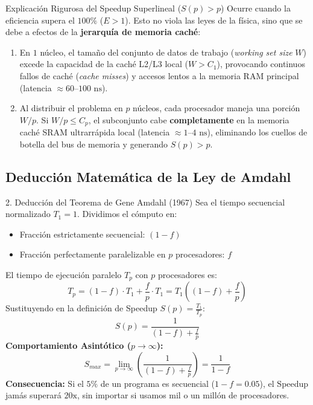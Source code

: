 \documentclass[11pt,a4paper]{article}
\begin{document}
\begin{conceptbox}{Explicación Rigurosa del Speedup Superlineal ($S(p) > p$)}
Ocurre cuando la eficiencia supera el $100\%$ ($E > 1$). Esto no viola las leyes de la física, sino que se debe a efectos de la \textbf{jerarquía de memoria caché}:
\begin{enumerate}[leftmargin=5mm]
    \item En $1$ núcleo, el tamaño del conjunto de datos de trabajo (\textit{working set size} $W$) excede la capacidad de la caché L2/L3 local ($W > C_1$), provocando continuos fallos de caché (\textit{cache misses}) y accesos lentos a la memoria RAM principal (latencia $\approx 60\text{--}100\text{ ns}$).
    \item Al distribuir el problema en $p$ núcleos, cada procesador maneja una porción $W/p$. Si $W/p \le C_p$, el subconjunto cabe \textbf{completamente} en la memoria caché SRAM ultrarrápida local (latencia $\approx 1\text{--}4\text{ ns}$), eliminando los cuellos de botella del bus de memoria y generando $S(p) > p$.
\end{enumerate}
\end{conceptbox}

\subsection{Deducción Matemática de la Ley de Amdahl}

\begin{formulabox}{2. Deducción del Teorema de Gene Amdahl (1967)}
Sea el tiempo secuencial normalizado $T_1 = 1$. Dividimos el cómputo en:
\begin{itemize}[leftmargin=5mm]
    \item Fracción estrictamente secuencial: $(1-f)$
    \item Fracción perfectamente paralelizable en $p$ procesadores: $f$
\end{itemize}
El tiempo de ejecución paralelo $T_p$ con $p$ procesadores es:
\[
T_p = (1-f) \cdot T_1 + \frac{f}{p} \cdot T_1 = T_1 \left( (1-f) + \frac{f}{p} \right)
\]
Sustituyendo en la definición de Speedup $S(p) = \frac{T_1}{T_p}$:
\[
\boxed{S(p) = \frac{1}{(1-f) + \frac{f}{p}}}
\]
\textbf{Comportamiento Asintótico ($p \to \infty$):}
\[
\boxed{S_{max} = \lim_{p \to \infty} \left( \frac{1}{(1-f) + \frac{f}{p}} \right) = \frac{1}{1-f}}
\]
\textbf{Consecuencia:} Si el $5\%$ de un programa es secuencial ($1-f = 0.05$), el Speedup jamás superará $20\text{x}$, sin importar si usamos mil o un millón de procesadores.
\end{formulabox}
\end{document}
